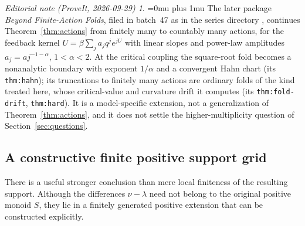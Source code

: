 \documentclass[11pt,a4paper]{article}
\theoremstyle{definition}
\theoremstyle{remark}
\newtheorem*{ednoteinner}{Editorial note (ProveIt, 2026-09-29)}
\newenvironment{ednote}{\begin{ednoteinner}\sloppy\Urlmuskip=0mu plus 1mu\relax}{\end{ednoteinner}}
\begin{document}
\begin{ednote}
The later package \emph{Beyond Finite-Action Folds}, filed in batch~47
as  in the
series directory , continues
Theorem~\ref{thm:actions} from finitely many to countably many actions, for
the feedback kernel $U=\beta\sum_j a_jq^je^{jU}$ with linear slopes and
power-law amplitudes $a_j=a j^{-1-\alpha}$, $1<\alpha<2$. At the critical
coupling the square-root fold becomes a nonanalytic boundary with exponent
$1/\alpha$ and a convergent Hahn chart (its \texttt{thm:hahn}); its
truncations to finitely many actions are ordinary folds of the kind treated
here, whose critical-value and curvature drift it computes (its
\texttt{thm:fold-drift}, \texttt{thm:hard}). It is a model-specific
extension, not a generalization of Theorem~\ref{thm:actions}, and it does not
settle the higher-multiplicity question of Section~\ref{sec:questions}.
\end{ednote}

\subsection{A constructive finite positive support grid}
There is a useful stronger conclusion than mere local finiteness of the
resulting support. Although the differences $\nu-\lambda$ need not
belong to the original positive monoid $S$, they lie in a finitely
generated positive extension that can be constructed explicitly.
\end{document}
